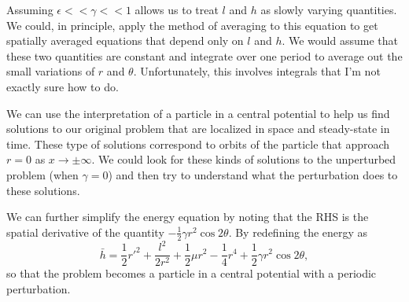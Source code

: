 \documentclass[api,pof,pre,12pt,a4paper]{revtex4-1}
\newcommand{\beqn}{\begin{equation}}
\newcommand{\eeqn}{\end{equation}}
\newcommand{\half}{\ensuremath{\frac{1}{2}}}
\begin{document}
Assuming $\epsilon <<\gamma <<1$ allows us to treat $l$ and $h$ as slowly varying quantities.  We could, in principle, apply the method of averaging to this equation to get spatially averaged equations that depend only on $l$ and $h$.  We would assume that these two quantities are constant and integrate over one period to average out the small variations of $r$ and $\theta$.  Unfortunately, this involves integrals that I'm not exactly sure how to do.

We can use the interpretation of a particle in a central potential to help us find solutions to our original problem that are localized in space and steady-state in time.  These type of solutions correspond to  orbits of the particle that approach $r=0$ as $x\rightarrow \pm \infty$.  We could look for these kinds of solutions to the unperturbed problem (when $\gamma=0$) and then try to understand what the perturbation does to these solutions. 

We can further simplify the energy equation by noting that the RHS is the spatial derivative of the quantity $-\half \gamma r^2 \cos 2 \theta$. By redefining the energy as
\beqn
\bar{h}=\frac{1}{2} r'^2 +\frac{l^2}{2r^2} +\frac{1}{2}\mu r^2 -\frac{1}{4} r^4+\half \gamma r^2 \cos 2 \theta,
\eeqn
so that the problem becomes a particle in a central potential with a periodic perturbation.


\end{document}
